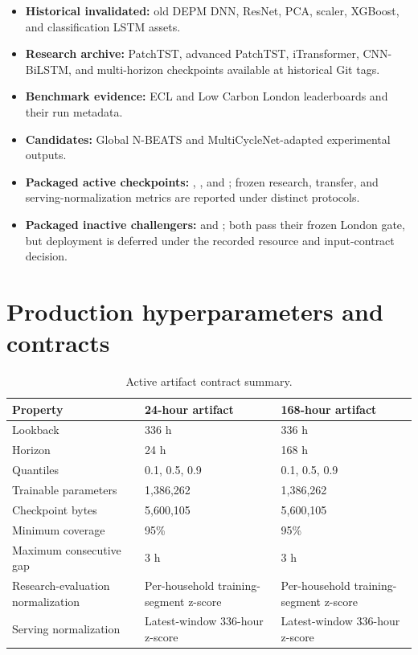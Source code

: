 \begin{itemize}
  \item \textbf{Historical invalidated:} old DEPM DNN, ResNet, PCA, scaler, XGBoost, and classification LSTM assets.
  \item \textbf{Research archive:} PatchTST, advanced PatchTST, iTransformer, CNN-BiLSTM, and multi-horizon checkpoints available at historical Git tags.
  \item \textbf{Benchmark evidence:} ECL and Low Carbon London leaderboards and their run metadata.
  \item \textbf{Candidates:} Global N-BEATS and MultiCycleNet-adapted experimental outputs.
  \item \textbf{Packaged active checkpoints:} , , and ; frozen research, transfer, and serving-normalization metrics are reported under distinct protocols.
  \item \textbf{Packaged inactive challengers:}  and ; both pass their frozen London gate, but deployment is deferred under the recorded resource and input-contract decision.
\end{itemize}

\section{Production hyperparameters and contracts}

\begin{table}[H]
\centering
\caption{Active artifact contract summary.}
\begin{tabular}{p{}p{}p{}}
\toprule
\textbf{Property} & \textbf{24-hour artifact} & \textbf{168-hour artifact} \\
\midrule
Lookback & 336 h & 336 h \\
Horizon & 24 h & 168 h \\
Quantiles & 0.1, 0.5, 0.9 & 0.1, 0.5, 0.9 \\
Trainable parameters & 1,386,262 & 1,386,262 \\
Checkpoint bytes & 5,600,105 & 5,600,105 \\
Minimum coverage & 95\% & 95\% \\
Maximum consecutive gap & 3 h & 3 h \\
Research-evaluation normalization & Per-household training-segment z-score & Per-household training-segment z-score \\
Serving normalization & Latest-window 336-hour z-score & Latest-window 336-hour z-score \\
\bottomrule
\end{tabular}
\end{table}

